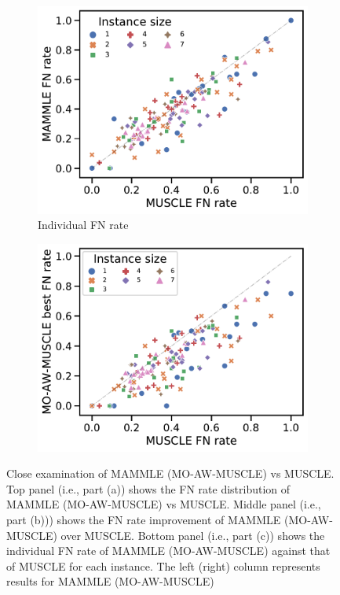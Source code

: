 \begin{figure}[!htbp]
\begin{adjustwidth}{-1.2cm}{}
		\begin{subfigure}{0.40\textwidth} \includegraphics[width=\textwidth]{Figure/delta5} \caption{Individual FN rate}\label{fig:scatter_fn}\end{subfigure}
		\begin{subfigure}{0.40\textwidth} \includegraphics[width=\textwidth]{Figure/delta5-momuscle} 
		\end{subfigure}
	\end{adjustwidth}
	\caption[Close examination of MAMMLE (MO-AW-MUSCLE) vs MUSCLE]{Close examination of MAMMLE (MO-AW-MUSCLE) vs MUSCLE. Top panel (i.e., part (a)) shows the FN rate distribution of MAMMLE (MO-AW-MUSCLE) vs MUSCLE. Middle panel (i.e., part (b))) shows the FN rate improvement of MAMMLE (MO-AW-MUSCLE) over MUSCLE. Bottom panel (i.e., part (c)) shows the individual FN rate of MAMMLE (MO-AW-MUSCLE) against that of MUSCLE for each instance. The left (right) column represents results for MAMMLE (MO-AW-MUSCLE) }
	\label{fig:mammle-result}
\end{figure}



